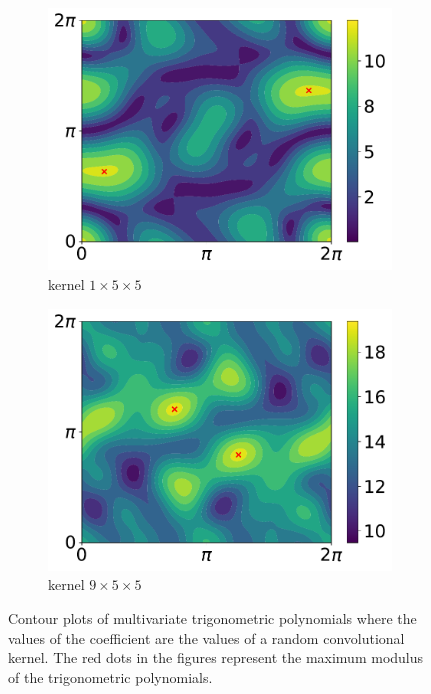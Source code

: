 \begin{figure}[htb]
  \begin{subfigure}[b]{.49\textwidth}
    \centering
    \includegraphics[scale=0.35]{figures/main/ch5-lipschitz_regularization/contour_poly_200_1_1_5.pdf}
    \caption{kernel $1\times5\times5$}
  \end{subfigure}
  \begin{subfigure}[b]{.49\textwidth}
    \centering
    \includegraphics[scale=0.35]{figures/main/ch5-lipschitz_regularization/contour_poly_200_1_9_5.pdf}
    \caption{kernel $9\times5\times5$}
  \end{subfigure}
  \caption{Contour plots of multivariate trigonometric polynomials where the values of the coefficient are the values of a random convolutional kernel. The red dots in the figures represent the maximum modulus of the trigonometric polynomials.}
  \label{figure:contour_plot_trigonometric_polynomials}
\end{figure}%


